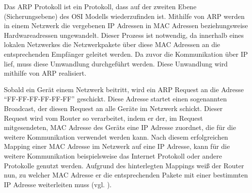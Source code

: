 Das \ac{ARP} Protokoll ist ein Protokoll, dass auf der zweiten Ebene (Sicherungsebene) des \ac{OSI} Modells wiederzufinden ist. Mithilfe von \ac{ARP} werden in einem Netzwerk die vergebenen \ac{IP} Adressen in \ac{MAC} Adressen beziehungsweise Hardwareadressen ungewandelt. Dieser Prozess ist notwendig, da innerhalb eines lokalen Netzwerkes die Netzwerkpakete über diese \ac{MAC} Adressen an die entsprechenden Empfänger geleitet werden. Da zuvor die Kommunikation über \ac{IP} lief, muss diese Umwandlung durchgeführt werden. 
Diese Unwandlung wird mithilfe von \ac{ARP} realisiert. 

Sobald ein Gerät einem Netzwerk beitritt, wird ein \ac{ARP} Request an die Adresse ``FF-FF-FF-FF-FF-FF'' geschickt. Diese Adresse startet einen sogenannten Broadcast, der diesen Request an alle Geräte im Netzwerk schickt. Dieser Request wird vom Router so verarbeitet, indem er der, im Request mitgesendeten, \ac{MAC} Adresse des Geräts eine \ac{IP} Adresse zuordnet, die für die weitere Kommunikation verwendet werden kann. Nach diesem erfolgreichen Mapping einer \ac{MAC} Adresse im Netzwerk auf eine \ac{IP} Adresse, kann für die weitere Kommunikation beispielsweise das Internet Protokoll oder andere Protokolle genutzt werden. Aufgrund des hinterlegten Mappings weiß der Router nun, zu welcher \ac{MAC} Adresse er die entsprechenden Pakete mit einer bestimmten \ac{IP} Adresse weiterleiten muss (vgl. \cite{.r}\cite{.s}).